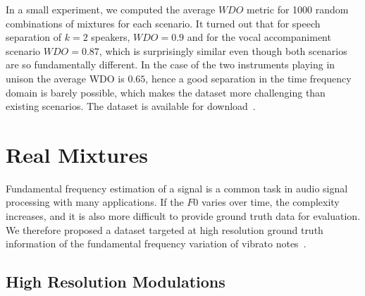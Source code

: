 In a small experiment, we computed the average \(WDO\) metric for 1000 random combinations of mixtures for each scenario.
It turned out that for speech separation of \(k=2\) speakers, \(WDO=0.9\) and for the vocal accompaniment scenario \(WDO=0.87\), which is surprisingly similar even though both scenarios are so fundamentally different.
In the case of the two instruments playing in unison the average WDO is \(0.65\), hence a good separation in the time frequency domain is barely possible, which makes the dataset more challenging than existing scenarios.
The dataset is available for download~\cite{oss_unison}.

\begin{figure}
\end{figure}


\section{Real Mixtures}

Fundamental frequency estimation of a signal is a common task in audio signal processing with many applications. 
If the $F0$ varies over time, the complexity increases, and it is also more difficult to provide ground truth data for evaluation.
We therefore proposed a dataset targeted at high resolution ground truth information of the fundamental frequency variation of vibrato notes~\cite{stoeter15acm}.

\subsection{High Resolution Modulations}

